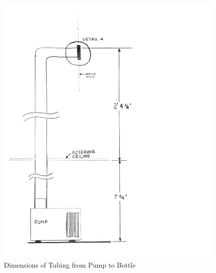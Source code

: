 \documentclass[12pt]{article}
\begin{document}
\begin{figure}[H]
    \centering
    \includegraphics[width=163mm]{resources/tubing-pump-to-bottle.png}
    \caption{Dimensions of Tubing from Pump to Bottle}
\end{figure}
\end{document}
